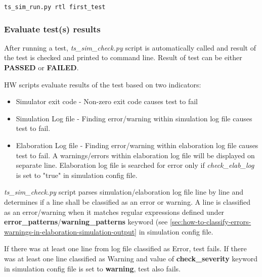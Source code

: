 \documentclass{tropic_design_spec}
\begin{document}
\begin{lstlisting}
ts_sim_run.py rtl first_test
\end{lstlisting}



\subsubsection{Evaluate test(s) results}
\label{sec:evaluate-test-results}

After running a test, \textit{ts_sim_check.py} script is automatically called and
result of the test is checked and printed to command line. Result of test can be either
\textbf{PASSED} or \textbf{FAILED}.

HW scripts evaluate results of the test based on two indicators:
\begin{itemize}
    \item Simulator exit code - Non-zero exit code causes test to fail
    \item Simulation Log file - Finding error/warning within simulation log
                                file causes test to fail.
    \item Elaboration Log file - Finding error/warning within elaboration log
                                file causes test to fail. A warnings/errors within elaboration
                                log file will be displayed on separate line. Elaboration log
                                file is searched for error only if \textit{check_elab_log} is set
                                to "true" in simulation config file.
\end{itemize}

\textit{ts_sim_check.py} script parses simulation/elaboration log file line by line and
determines if a line shall be classified as an error or warning. A line is classified
as an error/warning when it matches regular expressions defined under 
\textbf{error_patterns}/\textbf{warning_patterns} keyword (see
\ref{sec:how-to-classify-errors-warnings-in-elaboration-simulation-output} in simulation
config file.

If there was at least one line from log file classified as Error, test fails.
If there was at least one line classified as Warning and value of
\textbf{check_severity} keyword in simulation config file is set to
\textbf{warning}, test also fails.
\end{document}

